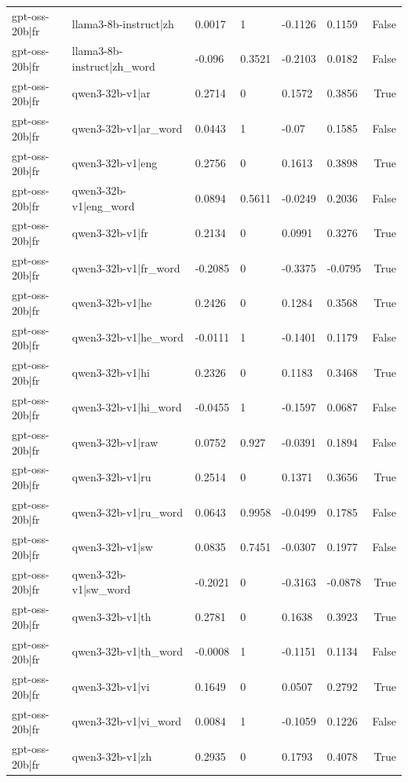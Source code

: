 \begin{table}
\begin{tabular}{llllllr}
gpt-oss-20b|fr & llama3-8b-instruct|zh & 0.0017 & 1 & -0.1126 & 0.1159 & False \\
gpt-oss-20b|fr & llama3-8b-instruct|zh_word & -0.096 & 0.3521 & -0.2103 & 0.0182 & False \\
gpt-oss-20b|fr & qwen3-32b-v1|ar & 0.2714 & 0 & 0.1572 & 0.3856 & True \\
gpt-oss-20b|fr & qwen3-32b-v1|ar_word & 0.0443 & 1 & -0.07 & 0.1585 & False \\
gpt-oss-20b|fr & qwen3-32b-v1|eng & 0.2756 & 0 & 0.1613 & 0.3898 & True \\
gpt-oss-20b|fr & qwen3-32b-v1|eng_word & 0.0894 & 0.5611 & -0.0249 & 0.2036 & False \\
gpt-oss-20b|fr & qwen3-32b-v1|fr & 0.2134 & 0 & 0.0991 & 0.3276 & True \\
gpt-oss-20b|fr & qwen3-32b-v1|fr_word & -0.2085 & 0 & -0.3375 & -0.0795 & True \\
gpt-oss-20b|fr & qwen3-32b-v1|he & 0.2426 & 0 & 0.1284 & 0.3568 & True \\
gpt-oss-20b|fr & qwen3-32b-v1|he_word & -0.0111 & 1 & -0.1401 & 0.1179 & False \\
gpt-oss-20b|fr & qwen3-32b-v1|hi & 0.2326 & 0 & 0.1183 & 0.3468 & True \\
gpt-oss-20b|fr & qwen3-32b-v1|hi_word & -0.0455 & 1 & -0.1597 & 0.0687 & False \\
gpt-oss-20b|fr & qwen3-32b-v1|raw & 0.0752 & 0.927 & -0.0391 & 0.1894 & False \\
gpt-oss-20b|fr & qwen3-32b-v1|ru & 0.2514 & 0 & 0.1371 & 0.3656 & True \\
gpt-oss-20b|fr & qwen3-32b-v1|ru_word & 0.0643 & 0.9958 & -0.0499 & 0.1785 & False \\
gpt-oss-20b|fr & qwen3-32b-v1|sw & 0.0835 & 0.7451 & -0.0307 & 0.1977 & False \\
gpt-oss-20b|fr & qwen3-32b-v1|sw_word & -0.2021 & 0 & -0.3163 & -0.0878 & True \\
gpt-oss-20b|fr & qwen3-32b-v1|th & 0.2781 & 0 & 0.1638 & 0.3923 & True \\
gpt-oss-20b|fr & qwen3-32b-v1|th_word & -0.0008 & 1 & -0.1151 & 0.1134 & False \\
gpt-oss-20b|fr & qwen3-32b-v1|vi & 0.1649 & 0 & 0.0507 & 0.2792 & True \\
gpt-oss-20b|fr & qwen3-32b-v1|vi_word & 0.0084 & 1 & -0.1059 & 0.1226 & False \\
gpt-oss-20b|fr & qwen3-32b-v1|zh & 0.2935 & 0 & 0.1793 & 0.4078 & True \\

\end{tabular}
\end{table}
